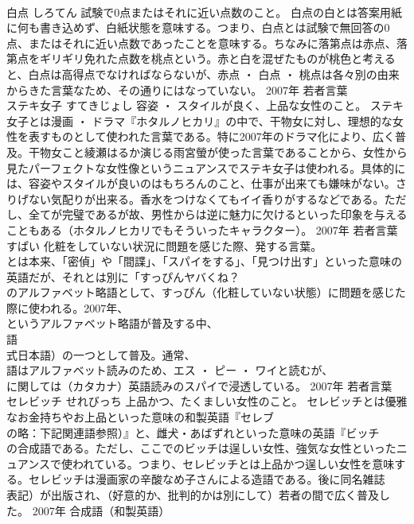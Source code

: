 \documentclass[8pt]{extreport}
\begin{document}
\begin{CJK}{UTF8}{min}
\\	白点	しろてん	試験で0点またはそれに近い点数のこと。	白点の白とは答案用紙に何も書き込めず、白紙状態を意味する。つまり、白点とは試験で無回答の0点、またはそれに近い点数であったことを意味する。ちなみに落第点は赤点、落第点をギリギリ免れた点数を桃点という。赤と白を混ぜたものが桃色と考えると、白点は高得点でなければならないが、赤点 ・ 白点 ・ 桃点は各々別の由来からきた言葉なため、その通りにはなっていない。	2007年	若者言葉	
\\	ステキ女子	すてきじょし	容姿 ・ スタイルが良く、上品な女性のこと。	ステキ女子とは漫画 ・ ドラマ『ホタルノヒカリ』の中で、干物女に対し、理想的な女性を表すものとして使われた言葉である。特に2007年のドラマ化により、広く普及。干物女こと綾瀬はるか演じる雨宮螢が使った言葉であることから、女性から見たパーフェクトな女性像というニュアンスでステキ女子は使われる。具体的には、容姿やスタイルが良いのはもちろんのこと、仕事が出来ても嫌味がない。さりげない気配りが出来る。香水をつけなくてもイイ香りがするなどである。ただし、全てが完璧であるが故、男性からは逆に魅力に欠けるといった印象を与えることもある（ホタルノヒカリでもそういったキャラクター）。	2007年	若者言葉	
\\	すぱい	化粧をしていない状況に問題を感じた際、発する言葉。	
\\	とは本来、「密偵」や「間諜」、「スパイをする」、「見つけ出す」といった意味の英語だが、それとは別に「すっぴんヤバくね？
\\	のアルファベット略語として、すっぴん（化粧していない状態）に問題を感じた際に使われる。2007年、
\\	というアルファベット略語が普及する中、
\\	語
\\	式日本語）の一つとして普及。通常、
\\	語はアルファベット読みのため、エス ・ ピー ・ ワイと読むが、
\\	に関しては（カタカナ）英語読みのスパイで浸透している。	2007年	若者言葉	
\\	セレビッチ	せれびっち	上品かつ、たくましい女性のこと。	セレビッチとは優雅なお金持ちやお上品といった意味の和製英語『セレブ
\\	の略：下記関連語参照）』と、雌犬・あばずれといった意味の英語『ビッチ
\\	の合成語である。ただし、ここでのビッチは逞しい女性、強気な女性といったニュアンスで使われている。つまり、セレビッチとは上品かつ逞しい女性を意味する。セレビッチは漫画家の辛酸なめ子さんによる造語である。後に同名雑誌
\\	表記）が出版され、（好意的か、批判的かは別にして）若者の間で広く普及した。	2007年	合成語（和製英語）	

\end{CJK}
\end{document}
